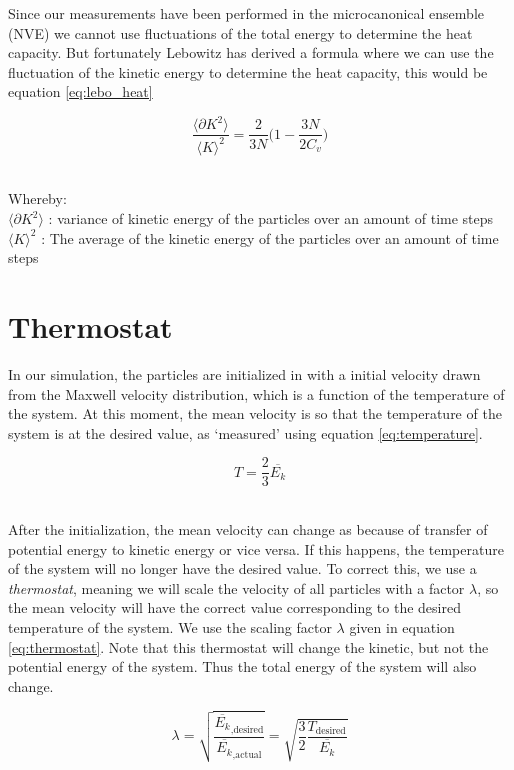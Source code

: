 \documentclass[12pt,a4paper]{report}
\begin{document}
Since our measurements have been performed in the microcanonical ensemble (NVE) we cannot use fluctuations of the total energy to determine the heat capacity. But fortunately Lebowitz\cite{lebowitz1967} has derived a formula where we can use the fluctuation of the kinetic energy to determine the heat capacity, this would be equation \ref{eq:lebo_heat}

\begin{equation}\label{eq:lebo_heat}
\frac{\langle \partial K^2 \rangle}{\langle K \rangle^2}=\frac{2}{3N} \big( 1-\frac{3N}{2C_v}\big)
\end{equation}\

Whereby:\\
$\langle \partial K^2 \rangle$ : variance of kinetic energy of the particles over an amount of time steps\\
$\langle K \rangle^2$ : The average of the kinetic energy of the particles over an amount of time steps

\section{Thermostat}

In our simulation, the particles are initialized in with a initial velocity drawn from the Maxwell velocity distribution, which is a function of the temperature of the system. At this moment, the mean velocity is so that the temperature of the system is at the desired value, as `measured' using equation \ref{eq:temperature}.

\begin{equation}\label{eq:temperature}
	T = \frac{2}{3} \overline{E_k}
\end{equation}\

After the initialization, the mean velocity can change as because of transfer of potential energy to kinetic energy or vice versa. If this happens, the temperature of the system will no longer have the desired value. To correct this, we use a \emph{thermostat}, meaning we will scale the velocity of all particles with a factor $\lambda$, so the mean velocity will have the correct value corresponding to the desired temperature of the system. We use the scaling factor $\lambda$ given in equation \ref{eq:thermostat}. Note that this thermostat will change the kinetic, but not the potential energy of the system. Thus the total energy of the system will also change.

\begin{equation}\label{eq:thermostat}
	\lambda = \sqrt{\frac{ \overline{E_{k}}_\text{,desired} }{ \overline{E_{k}}_\text{,actual} }} = \sqrt{\frac{3}{2} \frac{T_\text{desired}}{\overline{E_k}}}
\end{equation}
\end{document}
